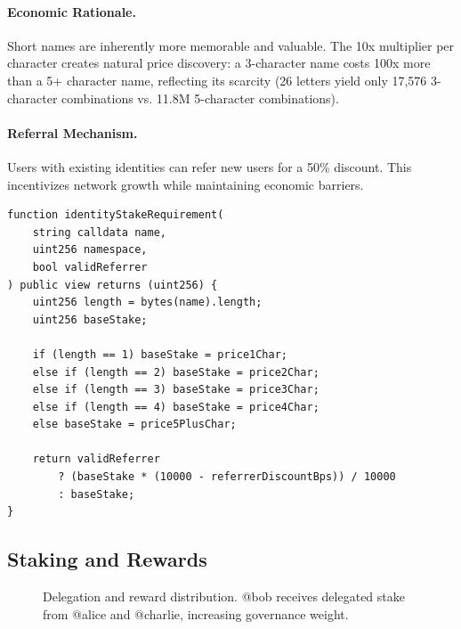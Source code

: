 \documentclass[11pt,twocolumn]{article}
\begin{document}
\paragraph{Economic Rationale.} Short names are inherently more memorable and valuable. The 10x multiplier per character creates natural price discovery: a 3-character name costs 100x more than a 5+ character name, reflecting its scarcity (26 letters yield only 17,576 3-character combinations vs. 11.8M 5-character combinations).

\paragraph{Referral Mechanism.} Users with existing identities can refer new users for a 50\% discount. This incentivizes network growth while maintaining economic barriers.

\begin{lstlisting}[language=Solidity]
function identityStakeRequirement(
    string calldata name,
    uint256 namespace,
    bool validReferrer
) public view returns (uint256) {
    uint256 length = bytes(name).length;
    uint256 baseStake;

    if (length == 1) baseStake = price1Char;
    else if (length == 2) baseStake = price2Char;
    else if (length == 3) baseStake = price3Char;
    else if (length == 4) baseStake = price4Char;
    else baseStake = price5PlusChar;

    return validReferrer
        ? (baseStake * (10000 - referrerDiscountBps)) / 10000
        : baseStake;
}
\end{lstlisting}

\subsection{Staking and Rewards}

\begin{figure}[t]
\centering
{}
\caption{Delegation and reward distribution. @bob receives delegated stake from @alice and @charlie, increasing governance weight.}
\label{fig:delegation}
\end{figure}
\end{document}
